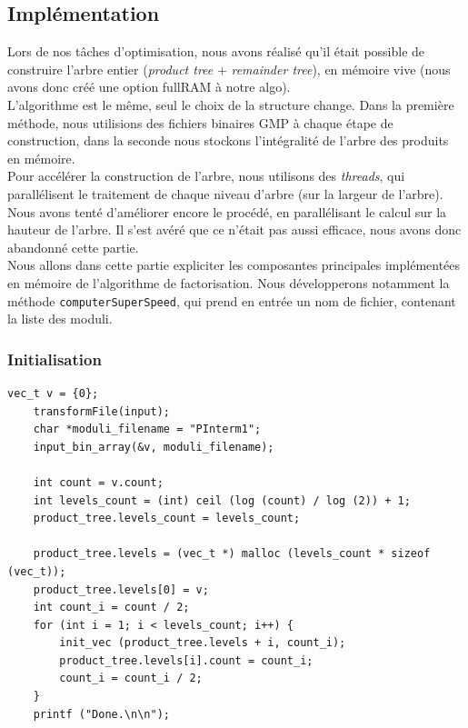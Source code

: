 \subsection{Implémentation}


Lors de nos tâches d'optimisation, nous avons réalisé qu'il était possible de construire l'arbre entier (\textit{product tree} + \textit{remainder tree}), en mémoire vive (nous avons donc créé une option fullRAM à notre algo).\\


L'algorithme est le même, seul le choix de la structure change.
Dans la première méthode, nous utilisions des fichiers binaires GMP à chaque étape de construction, dans la  seconde nous stockons l'intégralité de l'arbre des produits en mémoire.\\


Pour accélérer la construction de l'arbre, nous utilisons des \textit{threads}, qui parallélisent le traitement de chaque niveau d'arbre (sur la largeur de l'arbre).
Nous avons tenté d'améliorer encore le procédé, en parallélisant le calcul sur la hauteur de l'arbre. Il s'est avéré que ce n'était pas aussi efficace, nous avons donc abandonné cette partie.\\


Nous allons dans cette partie expliciter les composantes principales implémentées en mémoire de l'algorithme de factorisation.  Nous développerons notamment la méthode \texttt{computerSuperSpeed}, qui prend en entrée un nom de fichier, contenant la liste des moduli. 


\subsubsection{Initialisation}

\begin{lstlisting}[style=customc,caption=fact\_superspeed.c - partie 1, label=fact1]
	vec_t v = {0};
	transformFile(input);
	char *moduli_filename = "PInterm1";
	input_bin_array(&v, moduli_filename);
	
	int count = v.count;
	int levels_count = (int) ceil (log (count) / log (2)) + 1;
	product_tree.levels_count = levels_count;
	
	product_tree.levels = (vec_t *) malloc (levels_count * sizeof (vec_t));
	product_tree.levels[0] = v;
	int count_i = count / 2;
	for (int i = 1; i < levels_count; i++) {
		init_vec (product_tree.levels + i, count_i);
		product_tree.levels[i].count = count_i;
		count_i = count_i / 2;
	}
	printf ("Done.\n\n");
\end{lstlisting}

